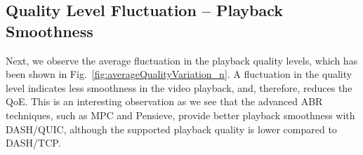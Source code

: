 

\subsection{Quality Level Fluctuation -- Playback Smoothness}
Next, we observe the average fluctuation in the playback quality levels, which has been shown in Fig.~\ref{fig:averageQualityVariation_n}. A fluctuation in the quality level indicates less smoothness in the video playback, and, therefore, reduces the QoE.  This is an interesting observation as we see that the advanced ABR techniques, such as MPC and Pensieve, provide better playback smoothness with DASH/QUIC, although the supported playback quality is lower compared to DASH/TCP. 

